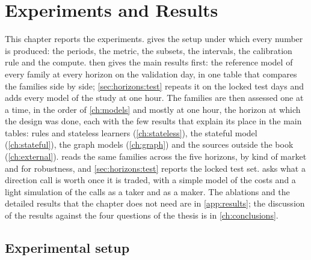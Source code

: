\chapter{Experiments and Results}
\label{ch:experiments}

This chapter reports the experiments.   gives the setup under
which every number is produced: the periods, the metric, the subsets, the intervals, the
calibration rule and the compute.   then gives the main results
first: the reference model of every family at every horizon on the validation day, in one
table that compares the families side by side; \cref{sec:horizons:test} repeats it on the
locked test days and adds every model of the study at one hour.  The families are then assessed one at a time, in the order of
\cref{ch:models} and mostly at one hour, the horizon at which the design was done, each with
the few results that explain its place in the main tables: rules and stateless learners
(\cref{ch:stateless}), the stateful model (\cref{ch:stateful}), the graph models
(\cref{ch:graph}) and the sources outside the book (\cref{ch:external}).
 reads the same families across the five horizons, by kind of market and
for robustness, and \cref{sec:horizons:test} reports the locked test set.
 asks what a direction call is worth once it is traded, with a simple model
of the costs and a light simulation of the calls as a taker and as a maker.  The ablations and
the detailed results that the chapter does not need are in \cref{app:results}; the
discussion of the results against the four questions of the thesis is in
\cref{ch:conclusions}.

\section{Experimental setup}
\label{sec:data:protocol}
\label{sec:models:protocol}

